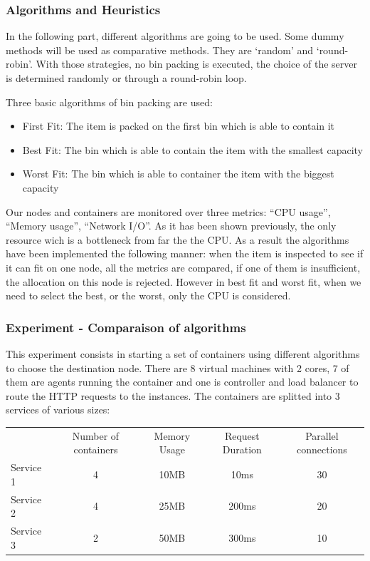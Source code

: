 \subsubsection{Algorithms and Heuristics}

In the following part, different algorithms are going to be used. Some dummy
methods will be used as comparative methods. They are `random' and
`round-robin'. With those strategies, no bin packing is executed, the choice
of the server is determined randomly or through a round-robin loop.

Three basic algorithms of bin packing are used:

\begin{itemize}
	\item{First Fit: The item is packed on the first bin which is able to contain it}
	\item{Best Fit: The bin which is able to contain the item with the smallest capacity}
	\item{Worst Fit: The bin which is able to container the item with the biggest capacity}
\end{itemize}

Our nodes and containers are monitored over three metrics: ``CPU usage'',
``Memory usage'', ``Network I/O''.  As it has been shown previously, the only
resource wich is a bottleneck from far the the CPU\@. As a result the
algorithms have been implemented the following manner: when the item is
inspected to see if it can fit on one node, all the metrics are compared, if
one of them is insufficient, the allocation on this node is rejected. However
in best fit and worst fit, when we need to select the best, or the worst, only
the CPU is considered.

\subsubsection{Experiment - Comparaison of algorithms}

This experiment consists in starting a set of containers using different
algorithms to choose the destination node. There are 8 virtual machines with 2
cores, 7 of them are agents running the container and one is controller and
load balancer to route the HTTP requests to the instances. The containers are
splitted into 3 services of various sizes:

\vspace{1em}
\begin{tabular}{l | c | c | c | c}
	& Number of containers & Memory Usage & Request Duration & Parallel connections \\
	Service 1 & 4 & 10MB & 10ms & 30 \\
	Service 2 & 4 & 25MB & 200ms & 20 \\
	Service 3 & 2 & 50MB & 300ms & 10 \\
\end{tabular}
\label{tab:exp2-services}
\vspace{1em}

